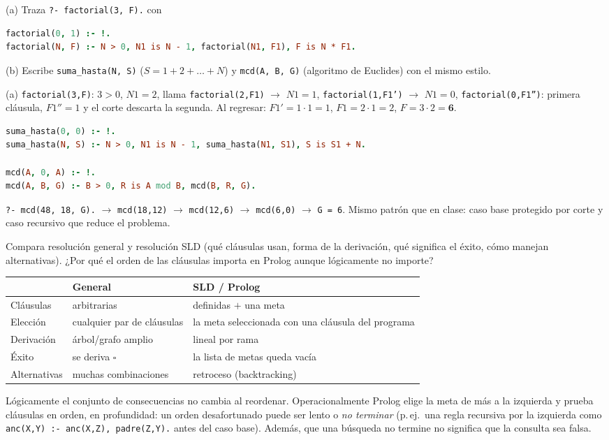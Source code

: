 \begin{prob}
(a) Traza \texttt{?- factorial(3, F).} con
\begin{lstlisting}[language=Prolog]
factorial(0, 1) :- !.
factorial(N, F) :- N > 0, N1 is N - 1, factorial(N1, F1), F is N * F1.
\end{lstlisting}
(b) Escribe \texttt{suma\_hasta(N, S)} ($S=1+2+\dots+N$) y \texttt{mcd(A, B, G)} (algoritmo de Euclides) con el mismo estilo.
\end{prob}
\begin{sol}
(a) \texttt{factorial(3,F)}: $3>0$, $N1=2$, llama \texttt{factorial(2,F1)} $\to$ $N1=1$, \texttt{factorial(1,F1')} $\to$ $N1=0$, \texttt{factorial(0,F1'')}: primera cláusula, $F1''=1$ y el corte descarta la segunda. Al regresar: $F1'=1\cdot1=1$, $F1=2\cdot1=2$, $F=3\cdot2=\mathbf 6$.
\begin{lstlisting}[language=Prolog]
suma_hasta(0, 0) :- !.
suma_hasta(N, S) :- N > 0, N1 is N - 1, suma_hasta(N1, S1), S is S1 + N.

mcd(A, 0, A) :- !.
mcd(A, B, G) :- B > 0, R is A mod B, mcd(B, R, G).
\end{lstlisting}
\texttt{?- mcd(48, 18, G).} $\to$ \texttt{mcd(18,12)} $\to$ \texttt{mcd(12,6)} $\to$ \texttt{mcd(6,0)} $\to$ \texttt{G = 6}. Mismo patrón que en clase: caso base protegido por corte y caso recursivo que reduce el problema.
\end{sol}

\begin{prob}
Compara resolución general y resolución SLD (qué cláusulas usan, forma de la derivación, qué significa el éxito, cómo manejan alternativas). ¿Por qué el orden de las cláusulas importa en Prolog aunque lógicamente no importe?
\end{prob}
\begin{sol}
\begin{tabular}{@{}p{3.3cm}p{5.8cm}p{6cm}@{}}
\toprule & General & SLD / Prolog\\\midrule
Cláusulas & arbitrarias & definidas $+$ una meta\\
Elección & cualquier par de cláusulas & la meta seleccionada con una cláusula del programa\\
Derivación & árbol/grafo amplio & lineal por rama\\
Éxito & se deriva $\square$ & la lista de metas queda vacía\\
Alternativas & muchas combinaciones & retroceso (backtracking)\\\bottomrule
\end{tabular}

Lógicamente el conjunto de consecuencias no cambia al reordenar. Operacionalmente Prolog elige la meta de más a la izquierda y prueba cláusulas en orden, en profundidad: un orden desafortunado puede ser lento o \emph{no terminar} (p.\,ej.\ una regla recursiva por la izquierda como \texttt{anc(X,Y) :- anc(X,Z), padre(Z,Y).} antes del caso base). Además, que una búsqueda no termine no significa que la consulta sea falsa.
\end{sol}
